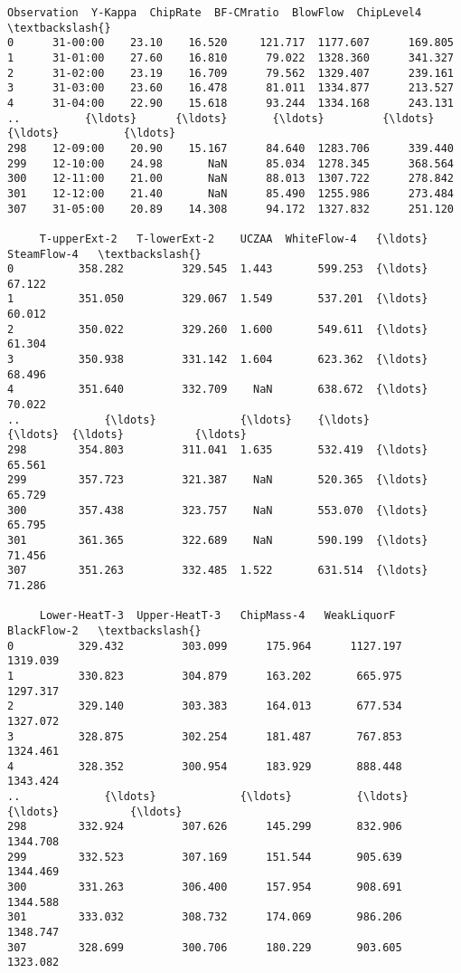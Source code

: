 \documentclass[11pt]{article}
\makeatletter
\newcommand{\boxspacing}{\kern\kvtcb@left@rule\kern\kvtcb@boxsep}
\newcommand{\prompt}[4]{
        {\ttfamily\llap{{\color{#2}[#3]:\hspace{3pt}#4}}\vspace{-\baselineskip}}
    }
\makeatother
\begin{document}
            \begin{tcolorbox}[breakable, size=fbox, boxrule=.5pt, pad at break*=1mm, opacityfill=0]
\prompt{Out}{outcolor}{14}{\boxspacing}
\begin{Verbatim}[commandchars=\\\{\}]
    Observation  Y-Kappa  ChipRate  BF-CMratio  BlowFlow  ChipLevel4   \textbackslash{}
0      31-00:00    23.10    16.520     121.717  1177.607      169.805
1      31-01:00    27.60    16.810      79.022  1328.360      341.327
2      31-02:00    23.19    16.709      79.562  1329.407      239.161
3      31-03:00    23.60    16.478      81.011  1334.877      213.527
4      31-04:00    22.90    15.618      93.244  1334.168      243.131
..          {\ldots}      {\ldots}       {\ldots}         {\ldots}       {\ldots}          {\ldots}
298    12-09:00    20.90    15.167      84.640  1283.706      339.440
299    12-10:00    24.98       NaN      85.034  1278.345      368.564
300    12-11:00    21.00       NaN      88.013  1307.722      278.842
301    12-12:00    21.40       NaN      85.490  1255.986      273.484
307    31-05:00    20.89    14.308      94.172  1327.832      251.120

     T-upperExt-2   T-lowerExt-2    UCZAA  WhiteFlow-4   {\ldots}  SteamFlow-4   \textbackslash{}
0          358.282         329.545  1.443       599.253  {\ldots}        67.122
1          351.050         329.067  1.549       537.201  {\ldots}        60.012
2          350.022         329.260  1.600       549.611  {\ldots}        61.304
3          350.938         331.142  1.604       623.362  {\ldots}        68.496
4          351.640         332.709    NaN       638.672  {\ldots}        70.022
..             {\ldots}             {\ldots}    {\ldots}           {\ldots}  {\ldots}           {\ldots}
298        354.803         311.041  1.635       532.419  {\ldots}        65.561
299        357.723         321.387    NaN       520.365  {\ldots}        65.729
300        357.438         323.757    NaN       553.070  {\ldots}        65.795
301        361.365         322.689    NaN       590.199  {\ldots}        71.456
307        351.263         332.485  1.522       631.514  {\ldots}        71.286

     Lower-HeatT-3  Upper-HeatT-3   ChipMass-4   WeakLiquorF   BlackFlow-2   \textbackslash{}
0          329.432         303.099      175.964      1127.197      1319.039
1          330.823         304.879      163.202       665.975      1297.317
2          329.140         303.383      164.013       677.534      1327.072
3          328.875         302.254      181.487       767.853      1324.461
4          328.352         300.954      183.929       888.448      1343.424
..             {\ldots}             {\ldots}          {\ldots}           {\ldots}           {\ldots}
298        332.924         307.626      145.299       832.906      1344.708
299        332.523         307.169      151.544       905.639      1344.469
300        331.263         306.400      157.954       908.691      1344.588
301        333.032         308.732      174.069       986.206      1348.747
307        328.699         300.706      180.229       903.605      1323.082


\end{Verbatim}
\end{tcolorbox}
\end{document}
